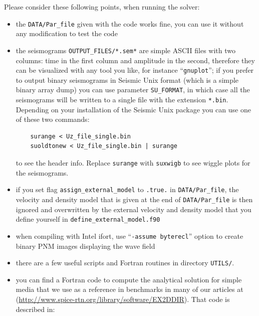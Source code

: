 \documentclass[oneside,english,onecolumn,letterpaper]{book}
\newcommand{\urlwithparentheses}[1]{(\url{#1})}
\begin{document}
Please consider these following points, when running the solver:
%
\begin{itemize}
\item the \texttt{DATA/Par\_file} given with the code works fine, you can use it without any modification to test the code

\item the seismograms \texttt{OUTPUT\_FILES/*.sem*} are simple ASCII files with two columns: time in the first column and amplitude in the second, therefore they can be visualized with any tool you like, for instance ``\texttt{gnuplot}''; if you prefer to output binary seismograms in Seismic Unix format (which is a simple binary array dump) you can use parameter \texttt{SU\_FORMAT}, in which case all the seismograms will be written to a single file with the extension \texttt{*.bin}.
Depending on your installation of the Seismic Unix package you can use one of these two commands:
%
\begin{verbatim}
    surange < Uz_file_single.bin
    suoldtonew < Uz_file_single.bin | surange
\end{verbatim}
%
to see the header info.
Replace \texttt{surange} with \texttt{suxwigb} to see wiggle plots for the seismograms.

\item if you set flag \texttt{assign\_external\_model} to \texttt{.true.} in \texttt{DATA/Par\_file}, the velocity and density model that is given at the end of \texttt{DATA/Par\_file} is then ignored and overwritten by the external velocity and density model that you define yourself in \texttt{define\_external\_model.f90}

\item when compiling with Intel ifort, use ``\texttt{-assume byterecl}'' option to create binary PNM images displaying the wave field

\item there are a few useful scripts and Fortran routines in directory \texttt{UTILS/}.

\item you can find a Fortran code to compute the analytical solution for simple media that we use as a reference in benchmarks in many of our articles at
\urlwithparentheses{http://www.spice-rtn.org/library/software/EX2DDIR}. That code is described in: \cite{BeIfNiSk94}

\end{itemize}
\end{document}
